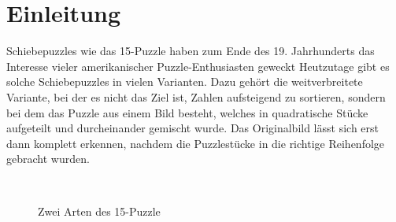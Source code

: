 \documentclass{whswinvcbook}
\begin{document}
\chapter{Einleitung}
Schiebepuzzles wie das 15-Puzzle haben zum Ende des 19. Jahrhunderts das Interesse vieler amerikanischer Puzzle-Enthusiasten geweckt\cite{perelman,sloson} Heutzutage gibt es solche Schiebepuzzles in vielen Varianten. Dazu gehört die weitverbreitete Variante, bei der es nicht das Ziel ist, Zahlen aufsteigend zu sortieren, sondern bei dem das Puzzle aus einem Bild besteht, welches in quadratische Stücke aufgeteilt und durcheinander gemischt wurde. Das Originalbild lässt sich erst dann komplett erkennen, nachdem die Puzzlestücke in die richtige Reihenfolge gebracht wurden.
\begin{figure}[H]
    \centering
    \quad\quad\quad\quad
    \\
    \quad\quad\quad\quad
    \caption{Zwei Arten des 15-Puzzle}
    \label{fig-15-puzzle}
\end{figure}
\end{document}
